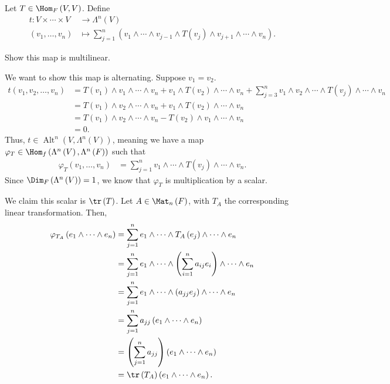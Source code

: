 \documentclass[10pt]{mypackage}
\DeclareMathOperator{\Alt}{Alt}
\begin{document}
  Let $T\in \Hom_{F}\left(V,V\right)$. Define
  \begin{align*}
    t: V\times\cdots\times V &\rightarrow \Lambda^{n}\left(V\right)\\
    \left(v_1,\dots,v_n\right) &\mapsto \sum_{j=1}^{n}\left(v_{1}\wedge\cdots\wedge v_{j-1}\wedge T\left(v_j\right)\wedge v_{j+1} \wedge \cdots \wedge v_n\right).
  \end{align*}
  \begin{exercise}[]
    Show this map is multilinear.
  \end{exercise}
  We want to show this map is alternating. Suppose $v_1 = v_2$.
  \begin{align*}
    t\left(v_1,v_2,\dots,v_n\right) &= T\left(v_1\right)\wedge v_1\wedge \cdots \wedge v_n + v_1\wedge T\left(v_2\right)\wedge\cdots\wedge v_n + \sum_{j=3}^{n}v_1\wedge v_2\wedge\cdots\wedge T\left(v_j\right)\wedge \cdots \wedge v_n\\
                                    &= T\left(v_1\right)\wedge v_2\wedge\cdots\wedge v_n + v_1\wedge T\left(v_2\right)\wedge\cdots\wedge v_n\\
                                    &= T\left(v_1\right)\wedge v_2\wedge\cdots\wedge v_n  - T\left(v_2\right)\wedge v_1\wedge\cdots\wedge v_n\\
                                    &= 0.
  \end{align*}
  Thus, $t\in \Alt^{n}\left(V,\Lambda^{n}\left(V\right)\right)$, meaning we have a map $\varphi_T\in \Hom_{f}\left(\Lambda^{n}\left(V\right),\Lambda^{n}\left(F\right)\right)$ such that
  \begin{align*}
    \varphi_{T}\left(v_1,\dots,v_n\right) &= \sum_{j=1}^{n}v_1\wedge\cdots\wedge T\left(v_j\right)\wedge\cdots\wedge v_n.
  \end{align*}
  Since $\Dim_{F}\left(\Lambda^{n}\left(V\right)\right) = 1$, we know that $\varphi_{T}$ is multiplication by a scalar.\newline

  We claim this scalar is $\tr\left(T\right)$. Let $A\in \Mat_{n}\left(F\right)$, with $T_A$ the corresponding linear transformation. Then,
  \begin{align*}
    \varphi_{T_A}\left(e_1\wedge\cdots\wedge e_n\right) &= \sum_{j=1}^{n}e_1\wedge\cdots\wedge T_{A}\left(e_j\right)\wedge\cdots\wedge e_n\\
                                                        &= \sum_{j=1}^{n} e_1\wedge\cdots \wedge \left(\sum_{i=1}^{n}a_{ij}e_i\right)\wedge\cdots \wedge e_n\\
                                                        &= \sum_{j=1}^{n}e_1\wedge\cdots\wedge \left(a_{jj}e_j\right)\wedge\cdots\wedge e_n\\
                                                        &= \sum_{j=1}^{n}a_{jj}\left(e_{1}\wedge\cdots\wedge e_n\right)\\
                                                        &= \left(\sum_{j=1}^{n}a_{jj}\right)\left(e_{1}\wedge\cdots\wedge e_{n}\right)\\
                                                        &= \tr\left(T_{A}\right)\left(e_1\wedge\cdots\wedge e_n\right).
  \end{align*}
\end{document}
